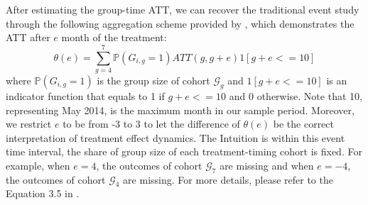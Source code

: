After estimating the group-time ATT, we can recover the traditional event study through the following aggregation scheme provided by \cite{callaway2021difference}, which demonstrates the ATT after $e$ month of the treatment:
\begin{equation}\label{eq:event_aggregation}
\theta(e) = \sum_{g=4}^7 \mathbb{P}(G_{i, g} = 1) ATT(g, g+e) 1[g+e <= 10]
\end{equation}
where $\mathbb{P}(G_{i, g} = 1)$ is the group size of cohort $\mathcal{G}_g$ and $1[g+e <= 10]$ is an indicator function that equals to 1 if $g+e <= 10$ and 0 otherwise. Note that 10, representing May 2014, is the maximum month in our sample period. Moreover, we restrict $e$ to be from -3 to 3 to let the difference of $\theta(e)$ be the correct interpretation of treatment effect dynamics. The Intuition is within this event time interval, the share of group size of each treatment-timing cohort is fixed. For example, when $e=4$, the outcomes of cohort $\mathcal{G}_7$ are missing and when $e=-4$, the outcomes of cohort $\mathcal{G}_4$ are missing. For more details, please refer to the Equation 3.5 in \cite{callaway2021difference}.
